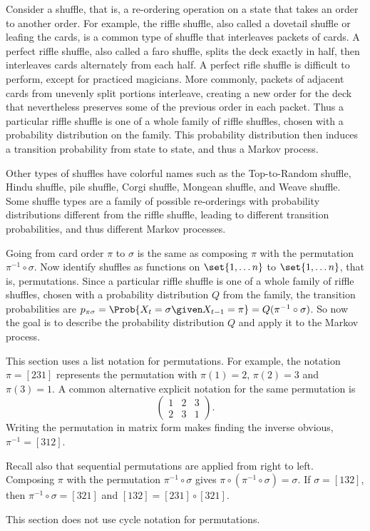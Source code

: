 \documentclass[12pt]{article}
\begin{document}
Consider a shuffle, that is, a re-ordering operation on a state that
takes an order to another order.  For example, the riffle shuffle, also
called a dovetail shuffle or leafing the cards, is a common type of
shuffle that interleaves packets of cards.  A perfect riffle shuffle,
also called a faro shuffle, splits the deck exactly in half, then
interleaves cards alternately from each half.  A perfect rifle shuffle is
difficult to perform, except for practiced magicians.  More commonly,
packets of adjacent cards from unevenly split portions interleave,
creating a new order for the deck that nevertheless preserves some of
the previous order in each packet.  Thus a particular riffle shuffle is
one of a whole family of riffle shuffles, chosen with a probability
distribution on the family.  This probability distribution then induces
a transition probability from state to state, and thus a Markov process.

Other types of shuffles have colorful names such as the Top-to-Random
shuffle, Hindu shuffle, pile shuffle, Corgi shuffle, Mongean shuffle,
and Weave shuffle. Some shuffle types are a family of possible
re-orderings with probability distributions different from the riffle
shuffle, leading to different transition probabilities, and thus
different Markov processes.

Going from card order \( \pi \) to \( \sigma \) is the same as composing \(
\pi \) with the permutation \( \pi^{-1} \circ \sigma \).  Now identify
shuffles as functions on \( \set{1, \dots n} \) to \( \set{1, \dots n} \),
that is, permutations.%
Since a particular riffle shuffle is one of a whole family of riffle
shuffles, chosen with a probability distribution \( Q \) from the
family, the transition probabilities are \( p_{\pi \sigma} = \Prob{X_t =
\sigma \given X_{t-1} = \pi} = Q(\pi^{-1} \circ \sigma) \).  So now the goal
is to describe the probability distribution \( Q \) and apply it to the
Markov process.

\begin{remark}
    This section uses a list notation for permutations.  For example,
    the notation \( \pi = [231] \) represents the permutation with \(
    \pi(1) = 2 \), \( \pi(2) = 3 \) and \( \pi(3) = 1 \).  A common
    alternative explicit notation for the same permutation is
    \[
        \begin{pmatrix}
            1 & 2 & 3 \\
            2 & 3 & 1
        \end{pmatrix}
        .
    \] Writing the permutation in matrix form makes finding the inverse
    obvious, \( \pi^{-1} = [312] \).

    Recall also that sequential permutations are applied from right to
    left.  Composing \( \pi \) with the permutation \( \pi^{-1} \circ
    \sigma \) gives \( \pi \circ (\pi^{-1} \circ \sigma) = \sigma \). If \(
    \sigma = [132] \), then \( \pi^{-1} \circ \sigma = [321] \) and \( [132]
    = [231] \circ [321] \).

    This section does not use cycle notation for permutations.
\end{remark}
\end{document}
